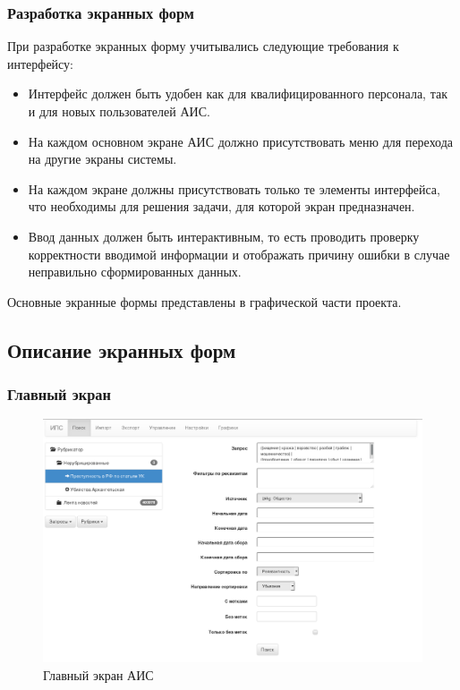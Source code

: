 \clearpage
\subsubsection{Разработка экранных форм}

При разработке экранных форму учитывались следующие требования к интерфейсу:
\begin{itemize}
\item Интерфейс должен быть удобен как для квалифицированного персонала, так и для новых пользователей АИС.
\item На каждом основном экране АИС должно присутствовать меню для перехода на другие экраны системы.
\item На каждом экране должны присутствовать только те элементы интерфейса, что необходимы для решения задачи, для которой экран предназначен.
\item Ввод данных должен быть интерактивным, то есть проводить проверку корректности вводимой информации и отображать причину ошибки в случае неправильно сформированных данных.
\end{itemize}

Основные экранные формы представлены в графической части проекта.

\clearpage
\subsection{Описание экранных форм}

\subsubsection{Главный экран}

  \begin{figure}[h!]
  \centering
  \includegraphics[width=0.9\linewidth]{technology/gui_main}
  \caption{Главный экран АИС}
  \label{figure:guiMain}
  \end{figure}


